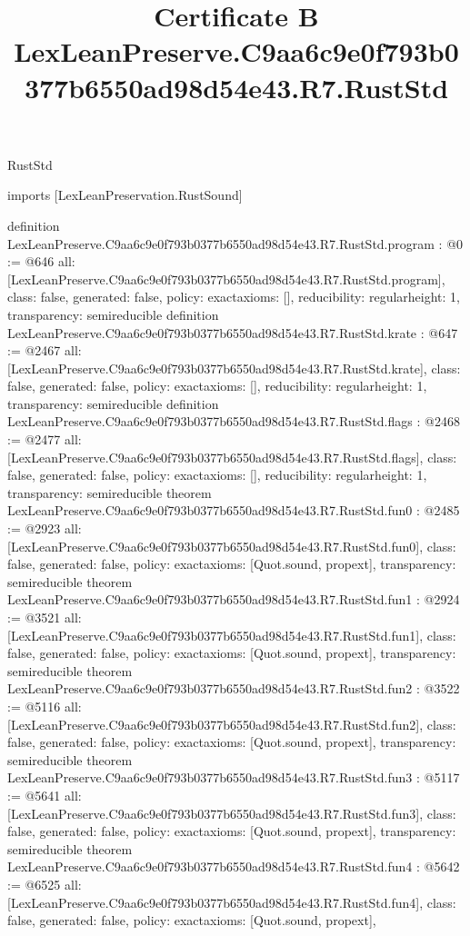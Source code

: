\begin{lexlean}{RustStd}
\title{Certificate B LexLeanPreserve.C9aa6c9e0f793b0377b6550ad98d54e43.R7.RustStd}
\begin{coremodule}
imports [LexLeanPreservation.RustSound]

definition LexLeanPreserve.C9aa6c9e0f793b0377b6550ad98d54e43.R7.RustStd.program : @0 := @646 {
  all: [LexLeanPreserve.C9aa6c9e0f793b0377b6550ad98d54e43.R7.RustStd.program],
  class: false,
  generated: false,
  policy: exact{axioms: []},
  reducibility: regular{height: 1},
  transparency: semireducible
}
definition LexLeanPreserve.C9aa6c9e0f793b0377b6550ad98d54e43.R7.RustStd.krate : @647 := @2467 {
  all: [LexLeanPreserve.C9aa6c9e0f793b0377b6550ad98d54e43.R7.RustStd.krate],
  class: false,
  generated: false,
  policy: exact{axioms: []},
  reducibility: regular{height: 1},
  transparency: semireducible
}
definition LexLeanPreserve.C9aa6c9e0f793b0377b6550ad98d54e43.R7.RustStd.flags : @2468 := @2477 {
  all: [LexLeanPreserve.C9aa6c9e0f793b0377b6550ad98d54e43.R7.RustStd.flags],
  class: false,
  generated: false,
  policy: exact{axioms: []},
  reducibility: regular{height: 1},
  transparency: semireducible
}
theorem LexLeanPreserve.C9aa6c9e0f793b0377b6550ad98d54e43.R7.RustStd.fun0 : @2485 := @2923 {
  all: [LexLeanPreserve.C9aa6c9e0f793b0377b6550ad98d54e43.R7.RustStd.fun0],
  class: false,
  generated: false,
  policy: exact{axioms: [Quot.sound, propext]},
  transparency: semireducible
}
theorem LexLeanPreserve.C9aa6c9e0f793b0377b6550ad98d54e43.R7.RustStd.fun1 : @2924 := @3521 {
  all: [LexLeanPreserve.C9aa6c9e0f793b0377b6550ad98d54e43.R7.RustStd.fun1],
  class: false,
  generated: false,
  policy: exact{axioms: [Quot.sound, propext]},
  transparency: semireducible
}
theorem LexLeanPreserve.C9aa6c9e0f793b0377b6550ad98d54e43.R7.RustStd.fun2 : @3522 := @5116 {
  all: [LexLeanPreserve.C9aa6c9e0f793b0377b6550ad98d54e43.R7.RustStd.fun2],
  class: false,
  generated: false,
  policy: exact{axioms: [Quot.sound, propext]},
  transparency: semireducible
}
theorem LexLeanPreserve.C9aa6c9e0f793b0377b6550ad98d54e43.R7.RustStd.fun3 : @5117 := @5641 {
  all: [LexLeanPreserve.C9aa6c9e0f793b0377b6550ad98d54e43.R7.RustStd.fun3],
  class: false,
  generated: false,
  policy: exact{axioms: [Quot.sound, propext]},
  transparency: semireducible
}
theorem LexLeanPreserve.C9aa6c9e0f793b0377b6550ad98d54e43.R7.RustStd.fun4 : @5642 := @6525 {
  all: [LexLeanPreserve.C9aa6c9e0f793b0377b6550ad98d54e43.R7.RustStd.fun4],
  class: false,
  generated: false,
  policy: exact{axioms: [Quot.sound, propext]},
}
\end{coremodule}
\end{lexlean}
